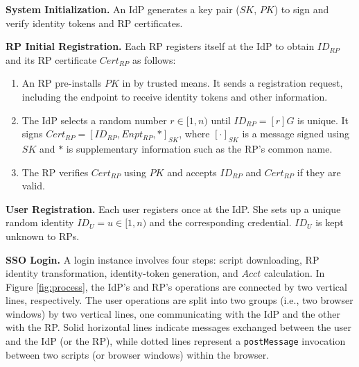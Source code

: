 \noindent \textbf{System Initialization.}
An IdP generates a key pair ($SK$, $PK$) to sign and verify identity tokens and RP certificates.

\vspace{0.5mm}
\noindent\textbf{RP Initial Registration.}
Each RP registers itself at the IdP to obtain $ID_{RP}$ and its RP certificate $Cert_{RP}$ as follows:
\vspace{-\topsep}\begin{enumerate}
\setlength{\topsep}{0pt}
\setlength{\partopsep}{0pt}
\setlength{\itemsep}{0pt}
\setlength{\parsep}{0pt}
\setlength{\parskip}{0pt}
\item
An RP pre-installs $PK$ in by trusted means.
It sends a registration request, including the endpoint to receive identity tokens and other information.
\item
The IdP selects a random number $r \in [1,n)$ until $ID_{RP} = [r]G$ is unique.
It signs $Cert_{RP} = [ID_{RP}, Enpt_{RP}, *]_{SK}$,
     where $[\cdot]_{SK}$ is a message signed using $SK$ and $*$ is supplementary information such as the RP's common name.
\item
The RP verifies $Cert_{RP}$ using $PK$ and accepts $ID_{RP}$ and $Cert_{RP}$ if they are valid.
\end{enumerate}


\noindent\textbf{User Registration.}
Each user registers once at the IdP. She sets up a unique random identity $ID_U = u \in [1, n)$ and the corresponding credential. $ID_U$ is kept unknown to RPs.


\vspace{0.5mm}
\noindent\textbf{SSO Login.} A login instance %
involves four steps: script downloading, RP identity transformation, identity-token generation, and $Acct$ calculation. In Figure \ref{fig:process}, the IdP's and RP's operations are connected by two vertical lines, respectively. The user operations are split into two groups (i.e., two browser windows) by two vertical lines, one communicating with the IdP and the other with the RP. Solid horizontal lines indicate messages exchanged between the user and the IdP (or the RP), while dotted lines represent a \verb+postMessage+ invocation between two scripts (or browser windows) within the browser.


